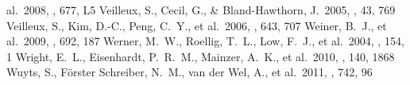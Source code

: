 \documentclass[apj]{emulateapj}
\begin{document}
\begin{thebibliography}{}
  al.\ 2008, \apjl, 677, L5
 Veilleux, S., Cecil, G., \&
  Bland-Hawthorn, J.\ 2005, \araa, 43, 769
 Veilleux, S., Kim, D.-C., Peng,
  C.~Y., et al.\ 2006, \apj, 643, 707
 Weiner, B.~J., et al.\ 2009,
  \apj, 692, 187
 Werner, M.~W., Roellig, T.~L.,
  Low, F.~J., et al.\ 2004, \apjs, 154, 1
 Wright, E.~L., Eisenhardt,
  P.~R.~M., Mainzer, A.~K., et al.\ 2010, \aj, 140, 1868
 Wuyts, S., F{\"o}rster Schreiber,
  N.~M., van der Wel, A., et al.\ 2011, \apj, 742, 96
\end{thebibliography}


\clearpage










% 

\end{document}

